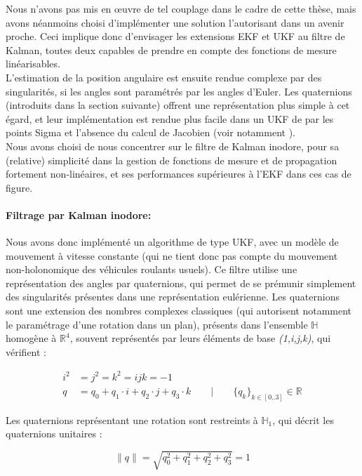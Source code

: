 Nous n'avons pas mis en œuvre de tel couplage dans le cadre de cette thèse, mais avons néanmoins choisi d'implémenter une solution l'autorisant dans un avenir proche. Ceci implique donc d'envisager les extensions EKF et UKF au filtre de Kalman, toutes deux capables de prendre en compte des fonctions de mesure linéarisables.\\

L'estimation de la position angulaire est ensuite rendue complexe par des singularités, si les angles sont paramétrés par les angles d'Euler. Les quaternions (introduits dans la section suivante) offrent une représentation plus simple à cet égard, et leur implémentation est rendue plus facile dans un UKF de par les points Sigma et l'absence du calcul de Jacobien (voir notamment \cite{Kraft2003}).\\

Nous avons choisi de nous concentrer sur le filtre de Kalman inodore, pour sa (relative) simplicité dans la gestion de fonctions de mesure et de propagation fortement non-linéaires, et ses performances supérieures à l'EKF dans ces cas de figure. 

\paragraph{Filtrage par Kalman inodore:\\}
Nous avons donc implémenté un algorithme de type UKF, avec un modèle de mouvement à vitesse constante (qui ne tient donc pas compte du mouvement non-holonomique des véhicules roulants usuels). Ce filtre utilise une représentation des angles par quaternions, qui permet de se prémunir simplement des singularités présentes dans une représentation eulérienne. Les quaternions sont une extension des nombres complexes classiques (qui autorisent notamment le paramétrage d'une rotation dans un plan), présents dans l'ensemble $\mathbb{H}$ homogène à $\mathbb{R}^4$, souvent représentés par leurs éléments de base \emph{(1,i,j,k)}, qui vérifient :

\begin{align}
	i^2 &= j^2 = k^2 = ijk = -1 \\
	q &= q_0 + q_1 \cdot i + q_2 \cdot j + q_3 \cdot k \qquad | \qquad \{q_k\}_{k \in [0..3]} \in \mathbb{R}
\end{align}

Les quaternions représentant une rotation sont restreints à $\mathbb{H}_1$, qui décrit les quaternions unitaires :

\begin{equation}
	\lVert q \rVert = \sqrt{q_0^2 + q_1^2 + q_2^2 + q_3^2} = 1
\end{equation}

